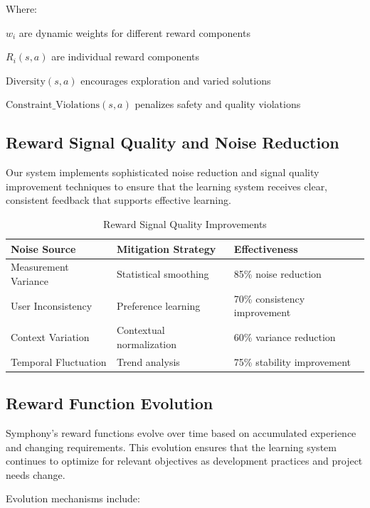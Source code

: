 Where:
\begin{compactlist}
    \item $w_i$ are dynamic weights for different reward components
    \item $R_i(s, a)$ are individual reward components
    \item $\text{Diversity}(s, a)$ encourages exploration and varied solutions
    \item $\text{Constraint\_Violations}(s, a)$ penalizes safety and quality violations
\end{compactlist}

\subsection*{Reward Signal Quality and Noise Reduction}

Our system implements sophisticated noise reduction and signal quality improvement techniques to ensure that the learning system receives clear, consistent feedback that supports effective learning.

\begin{table}[ht]
\centering
\begin{tabular}{@{}lll@{}}
\toprule
\textbf{Noise Source} & \textbf{Mitigation Strategy} & \textbf{Effectiveness} \\
\midrule
Measurement Variance & Statistical smoothing & 85\% noise reduction \\
User Inconsistency & Preference learning & 70\% consistency improvement \\
Context Variation & Contextual normalization & 60\% variance reduction \\
Temporal Fluctuation & Trend analysis & 75\% stability improvement \\
\bottomrule
\end{tabular}
\caption{Reward Signal Quality Improvements}
\end{table}

\subsection*{Reward Function Evolution}

Symphony's reward functions evolve over time based on accumulated experience and changing requirements. This evolution ensures that the learning system continues to optimize for relevant objectives as development practices and project needs change.

Evolution mechanisms include:

